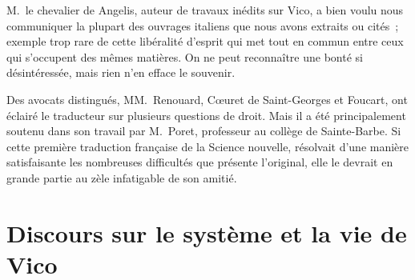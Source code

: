 \documentclass[french,twoside]{book} %
\begin{document}
M. le chevalier de Angelis, auteur de travaux inédits sur Vico, a bien voulu nous communiquer la plupart des ouvrages italiens que nous avons extraits ou cités ; exemple trop rare de cette libéralité d’esprit qui met tout en commun  entre ceux qui s’occupent des mêmes matières. On ne peut reconnaître une bonté si désintéressée, mais rien n’en efface le souvenir.\par
Des avocats distingués, MM. Renouard, Cœuret de Saint-Georges et Foucart, ont éclairé le traducteur sur plusieurs questions de droit. Mais il a été principalement soutenu dans son travail par M. Poret, professeur au collège de Sainte-Barbe. Si cette première traduction française de la Science nouvelle, résolvait d’une manière satisfaisante les nombreuses difficultés que présente l’original, elle le devrait en grande partie au zèle infatigable de son amitié.
\section[{Discours sur le système et la vie de Vico}]{Discours sur le système et la vie de Vico}
\label{discours}\renewcommand{\leftmark}{Discours sur le système et la vie de Vico}
\end{document}
